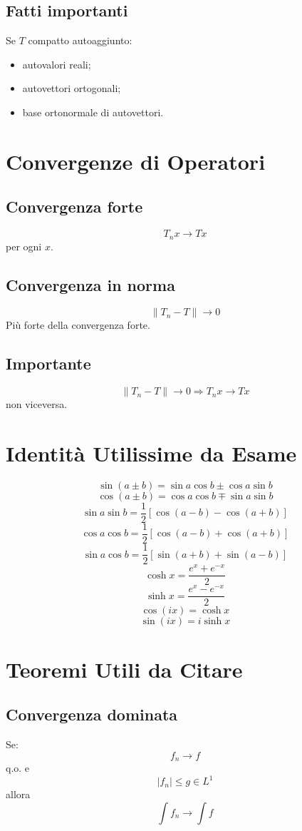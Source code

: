 \documentclass[a4paper,10pt]{article}
\begin{document}
\subsection{Fatti importanti}
Se $T$ compatto autoaggiunto:
\begin{itemize}
\item autovalori reali;
\item autovettori ortogonali;
\item base ortonormale di autovettori.
\end{itemize}
\section{Convergenze di Operatori}
\subsection{Convergenza forte}
\[T_nx\to Tx\]
per ogni $x$.
\subsection{Convergenza in norma}
\[\|T_n-T\|\to0\]
Più forte della convergenza forte.
\subsection{Importante}
\[\|T_n-T\|\to0
\Rightarrow T_nx\to Tx\]
non viceversa.
\section{Identità Utilissime da Esame}
\[\sin(a\pm b)=\sin a\cos b\pm\cos a\sin b\]
\[\cos(a\pm b)=\cos a\cos b\mp\sin a\sin b\]
\[\sin a\sin b=\frac12[\cos(a-b)-\cos(a+b)]\]
\[\cos a\cos b=\frac12[\cos(a-b)+\cos(a+b)]\]
\[\sin a\cos b=\frac12[\sin(a+b)+\sin(a-b)]\]
\[\cosh x=\frac{e^x+e^{-x}}2\]
\[\sinh x=\frac{e^x-e^{-x}}2\]
\[\cos(ix)=\cosh x\]
\[\sin(ix)=i\sinh x\]
\section{Teoremi Utili da Citare}
\subsection{Convergenza dominata}
Se:
\[f_n\to f\]
q.o. e
\[|f_n|\le g\in L^1\]
allora
\[\int f_n\to\int f\]
\end{document}
